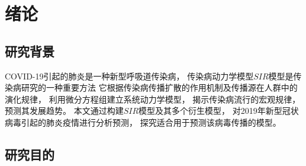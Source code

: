 \section{绪论}
\subsection{研究背景}
COVID-19引起的肺炎是一种新型呼吸道传染病，
传染病动力学模型$SIR$模型是传染病研究的一种重要方法
它根据传染病传播扩散的作用机制及传播源在人群中的演化规律，
利用微分方程组建立系统动力学模型，
揭示传染病流行的宏观规律，预测其发展趋势。
本文通过构建$SIR$模型及其多个衍生模型，
对2019年新型冠状病毒引起的肺炎疫情进行分析预测，
探究适合用于预测该病毒传播的模型。
\subsection{研究目的}